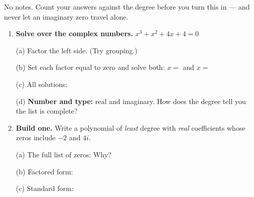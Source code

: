 \documentclass[10pt]{article}
\begin{document}
\namedateperiod

\vspace{0.10in}

No notes. Count your answers against the degree before you turn this in --- and never let an
imaginary zero travel alone.

\begin{enumerate}[leftmargin=1.8em, itemsep=12pt]
  \item \textbf{Solve over the complex numbers.} $x^3 + x^2 + 4x + 4 = 0$

    \vspace{3pt}
    (a) Factor the left side. (Try grouping.) 

    \vspace{3pt}
    (b) Set each factor equal to zero and solve both: $x = $  \quad and \quad
    $x = $ 

    \vspace{3pt}
    (c) All solutions: 

    \vspace{3pt}
    (d) \textbf{Number and type:}  real and  imaginary. How does the
    degree tell you the list is complete? 

  \item \textbf{Build one.} Write a polynomial of \emph{least} degree with \emph{real} coefficients
    whose zeros include $-2$ and $4i$.

    \vspace{3pt}
    (a) The full list of zeros:  \quad Why? 

    \vspace{3pt}
    (b) Factored form: 

    \vspace{3pt}
    (c) Standard form: 


\end{enumerate}
\end{document}

